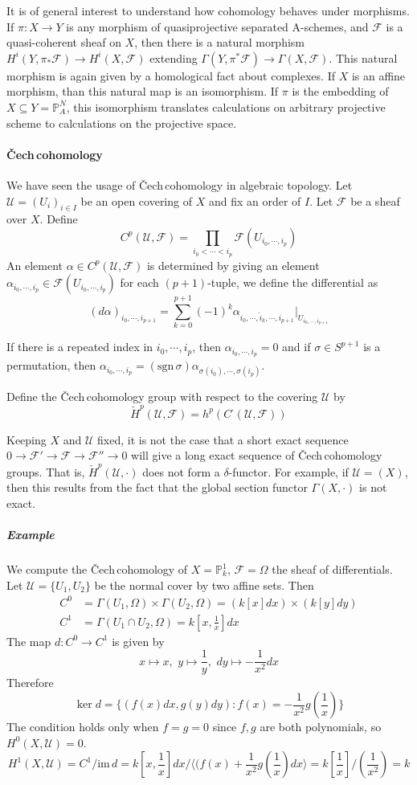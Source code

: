 \documentclass[12pt]{article}
\theoremstyle{plain}
\theoremstyle{definition}
\newcommand{\sU}{\mathcal{U}}
\newcommand{\IP}{\mathbb{P}}
\newcommand{\shF}{\mathscr{F}}
\newcommand{\<}{\langle}
\renewcommand{\>}{\rangle}
\def\what{\widehat}
\newcommand{\Ohm}{\Omega}
\newcommand{\Cech}{\v{C}ech\,}
\newcommand{\im}{\mathrm{im}\,}
\begin{document}
It is of general interest to understand how cohomology behaves under morphisms. If $\pi : X \to Y$ is any morphism of quasiprojective separated A-schemes, and $\shF$ is a quasi-coherent sheaf on $X$, then there is a natural morphism $H^i(Y, \pi_* \shF ) \to H^i(X, \shF)$ extending $\Gamma(Y, \pi^* \shF) \to \Gamma(X, \shF)$. This natural morphism is again given by a homological fact about complexes. If $X$ is an affine morphism, than this natural map is an isomorphism. If $\pi$ is the embedding of $X \subseteq Y = \IP^N_A$, this isomorphism translates calculations on arbitrary projective scheme to calculations on the projective space. 



\paragraph{\Cech cohomology}
We have seen the usage of \Cech cohomology in algebraic topology. Let $\sU = (U_i)_{i \in I}$ be an open covering of $X$ and fix an order of $I$. Let $\shF$ be a sheaf over $X$. Define 
$$ C^p(\sU, \shF) = \prod_{i_0 < \cdots < i_p} \shF(U_{i_0, \cdots, i_p}) $$
An element $\alpha \in C^p(\sU, \shF)$ is determined by giving an element $\alpha_{i_0, \cdots, i_p} \in \shF(U_{i_0, \cdots, i_p})$ for each $(p + 1)$-tuple, we define the differential as 
$$ (d\alpha)_{i_0, \cdots, i_{p+1}} = \sum_{k = 0}^{p + 1} (-1)^k \alpha_{i_0, \cdots, \what{i}_k, \cdots, i_{p+1}}|_{U_{i_0, \cdots, i_{p+1}}}$$

If there is a repeated index in $i_0, \cdots, i_p$, then $\alpha_{i_0, \cdots, i_p} = 0$ and if $\sigma \in S^{p+1}$ is a permutation, then $\alpha_{i_0, \cdots, i_p} = (\mathrm{sgn\,} \sigma) \alpha_{\sigma(i_0), \cdots, \sigma(i_p)}$.  

Define the \Cech cohomology group with respect to the covering $\sU$ by 
$$ \check{H}^p(\sU, \shF) = h^p(C^\cdot (\sU, \shF)) $$

Keeping $X$ and $\sU$ fixed, it is not the case that a short exact sequence 
$ 0 \to \shF' \to \shF \to \shF'' \to 0$ will give a long exact sequence of \Cech cohomology groups. That is, $\check{H}^p(\sU, \cdot)$ does not form a $\delta$-functor. For example, if $\sU = (X)$, then this results from the fact that the global section functor $\Gamma(X, \cdot)$ is not exact. 

\subparagraph{Example} We compute the \Cech cohomology of $X = \IP^1_k$, $\shF = \Ohm$ the sheaf of differentials. Let $\sU = \{ U_1, U_2 \}$ be the normal cover by two affine sets.  Then 
\begin{align*}
C^0 &= \Gamma(U_1, \Ohm) \times \Gamma(U_2, \Ohm) = (k[x] dx) \times (k[y] dy) \\
C^1 &= \Gamma(U_1 \cap U_2, \Ohm) = k[x, \frac{1}{x}] dx 
\end{align*} 
The map $d : C^0 \to C^1$ is given by 
$$ x \mapsto x, \, \, y \mapsto \frac{1}{y}, \, \, dy \mapsto - \frac{1}{x^2} dx $$
Therefore 
$$ \ker d = \{ (f(x) dx, g(y) dy) : f(x) = - \frac{1}{x^2} g(\frac{1}{x}) \}$$
The condition holds only when $f = g = 0$ since $f, g$ are both polynomials, so $H^0(X, \sU) = 0$. 
$$ H^1(X, \sU) = C^1/ \im d = k[x, \frac{1}{x}] dx/ \< (f(x) + \frac{1}{x^2} g(\frac{1}{x})dx \> = k[\frac{1}{x}]/(\frac{1}{x^2}) = k $$
\end{document}

